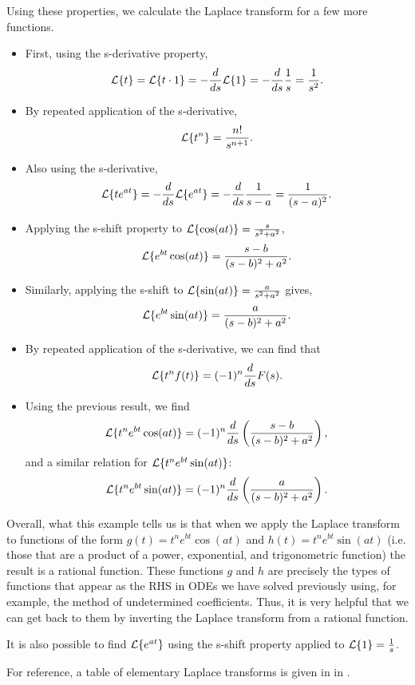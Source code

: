 \begin{eg}
	Using these properties, we calculate the Laplace transform for a few more functions.
	\begin{itemize}
		\item First, using the s-derivative property,
		\[
		\mathcal{L}\{t\} = \mathcal{L}\{t\cdot 1\} = -\frac{d}{ds}\mathcal{L}\{1\} = -\frac{d}{ds} \frac{1}{s} = \frac{1}{s^2}.
		\]
		\item By repeated application of the s-derivative,
		\[
		\mathcal{L}\{t^n\} = \frac{n!}{s^{n+1}}.
		\]
		\item Also using the s-derivative,
		\[
		\mathcal{L}\{te^{at}\} = -\frac{d}{ds} \mathcal{L}\{e^{at}\} = -\frac{d}{ds} \frac{1}{s-a} = \frac{1}{(s-a)^2}.
		\]
		\item Applying the s-shift property to $\mathcal{L}\{\cos(at)\} = \frac{s}{s^2+a^2}$,
		\[
		\mathcal{L}\{e^{bt}\cos(at)\} = \frac{s-b}{(s-b)^2+a^2}.
		\]
		\item Similarly, applying the s-shift to $\mathcal{L}\{\sin(at)\} = \frac{a}{s^2+a^2}$ gives,
		\[
		\mathcal{L}\{e^{bt}\sin(at)\} = \frac{a}{(s-b)^2+a^2}.
		\]
		\item By repeated application of the s-derivative, we can find that
		\[
		\mathcal{L}\{t^nf(t)\} = (-1)^n \frac{d}{ds}F(s).
		\]
		\item Using the previous result, we find
		\[
		\mathcal{L}\{t^ne^{bt}\cos(at)\} = (-1)^n\frac{d}{ds} \left(\frac{s-b}{(s-b)^2+a^2}\right),
		\]
		and a similar relation for $\mathcal{L}\{t^ne^{bt}\sin(at)\}$:
		\[
		\mathcal{L}\{t^ne^{bt}\sin(at)\} = (-1)^n\frac{d}{ds} \left(\frac{a}{(s-b)^2+a^2}\right).
		\]
	\end{itemize}
\end{eg}

Overall, what this example tells us is that when we apply the Laplace transform to functions of the form $g(t) = t^ne^{bt}\cos(at)$ and $h(t) = t^ne^{bt}\sin(at)$ (i.e. those that are a product of a power, exponential, and trigonometric function) the result is a rational function. These functions $g$ and $h$ are precisely the types of functions that appear as the RHS in ODEs we have solved previously using, for example, the method of undetermined coefficients. Thus, it is very helpful that we can get back to them by inverting the Laplace transform from a rational function.

\begin{remark}
	It is also possible to find $\mathcal{L}\{e^{at}\}$ using the s-shift property applied to $\mathcal{L}\{1\} = \frac{1}{s}$.
\end{remark}

For reference, a table of elementary Laplace transforms is given in  in .

